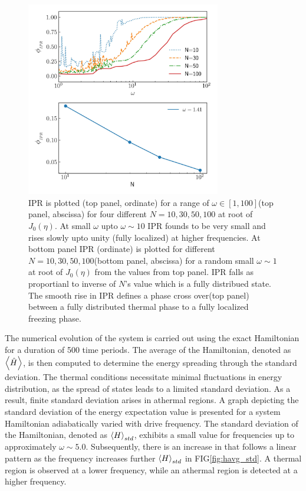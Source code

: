 \documentclass[%
reprint,
superscriptaddress,
amsmath,amssymb,
aps,
prb,
showkeys,
]{revtex4-2}
\begin{document}
	\begin{figure}[!ht]
		\centering
		\includegraphics[width =8.5cm]{phase_crossover_LMG.jpeg}
		\caption{IPR is plotted (top panel, ordinate) for a range of $\omega \in[1,100]$(top panel, abscissa) for four different $N=10,30,50, 100$ at root of $J_0(\eta)$. At small $\omega$ upto $\omega \sim 10$ IPR founds to be very small and rises slowly upto unity (fully localized) at higher frequencies. At bottom panel IPR (ordinate) is plotted for different $N=10,30,50, 100$(bottom panel, abscissa) for a random small $\omega \sim 1$ at root of $J_0(\eta)$ from the values from top panel. IPR falls as proportianl to inverse of $N$'s value which is a fully distribued state. The smooth rise in IPR defines a phase cross over(top panel) between a fully distributed thermal phase to a fully localized freezing phase.}
		\label{fig:phase_transition}
	\end{figure}

	The numerical evolution of the system is carried out using the exact Hamiltonian for a duration of 500 time periods. The average of the Hamiltonian, denoted as $\expval{\hat{H}}$, is then computed to determine the energy spreading through the standard deviation. The thermal conditions necessitate minimal fluctuations in energy distribution, as the spread of states leads to a limited standard deviation\cite{reimann_symmetry-prohibited_2021}. As a result, finite standard deviation arises in athermal regions. A graph depicting the standard deviation of the energy expectation value is presented for a system Hamiltonian adiabatically varied with drive frequency. The standard deviation of the Hamiltonian, denoted as $\expval{H}_{std}$, exhibits a small value for frequencies up to approximately $\omega \sim 5.0$. Subsequently, there is an increase in  that follows a linear pattern as the frequency increases further $\expval{H}_{std}$ in FIG\ref{fig:havg_std}. A thermal region is observed at a lower frequency, while an athermal region is detected at a higher frequency.
	
\end{document}
